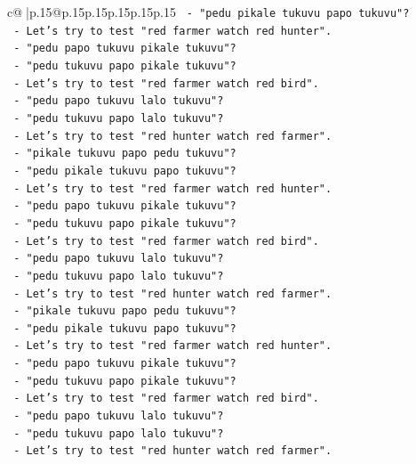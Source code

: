 \documentclass{article}
\begin{document}
{\begin{supertabular}{c@{$\;$}|p{.15\linewidth}@{}p{.15\linewidth}p{.15\linewidth}p{.15\linewidth}p{.15\linewidth}p{.15\linewidth}}
{{{\texttt{         {-} "pedu pikale tukuvu papo tukuvu"?} \\
\texttt{       {-} Let's try to test "red farmer watch red hunter".} \\
\texttt{         {-} "pedu papo tukuvu pikale tukuvu"?} \\
\texttt{         {-} "pedu tukuvu papo pikale tukuvu"?} \\
\texttt{       {-} Let's try to test "red farmer watch red bird".} \\
\texttt{         {-} "pedu papo tukuvu lalo tukuvu"?} \\
\texttt{         {-} "pedu tukuvu papo lalo tukuvu"?} \\
\texttt{       {-} Let's try to test "red hunter watch red farmer".} \\
\texttt{         {-} "pikale tukuvu papo pedu tukuvu"?} \\
\texttt{         {-} "pedu pikale tukuvu papo tukuvu"?} \\
\texttt{       {-} Let's try to test "red farmer watch red hunter".} \\
\texttt{         {-} "pedu papo tukuvu pikale tukuvu"?} \\
\texttt{         {-} "pedu tukuvu papo pikale tukuvu"?} \\
\texttt{       {-} Let's try to test "red farmer watch red bird".} \\
\texttt{         {-} "pedu papo tukuvu lalo tukuvu"?} \\
\texttt{         {-} "pedu tukuvu papo lalo tukuvu"?} \\
\texttt{       {-} Let's try to test "red hunter watch red farmer".} \\
\texttt{         {-} "pikale tukuvu papo pedu tukuvu"?} \\
\texttt{         {-} "pedu pikale tukuvu papo tukuvu"?} \\
\texttt{       {-} Let's try to test "red farmer watch red hunter".} \\
\texttt{         {-} "pedu papo tukuvu pikale tukuvu"?} \\
\texttt{         {-} "pedu tukuvu papo pikale tukuvu"?} \\
\texttt{       {-} Let's try to test "red farmer watch red bird".} \\
\texttt{         {-} "pedu papo tukuvu lalo tukuvu"?} \\
\texttt{         {-} "pedu tukuvu papo lalo tukuvu"?} \\
\texttt{       {-} Let's try to test "red hunter watch red farmer".} \\
}}}
\end{supertabular}}
\end{document}
